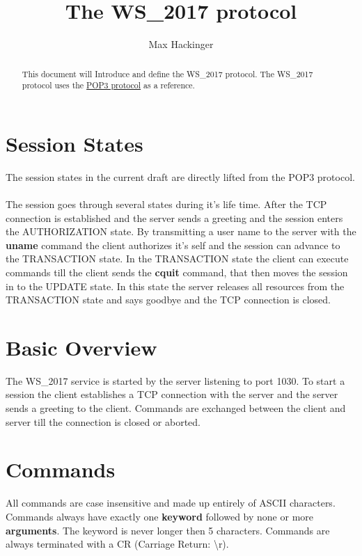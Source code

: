\documentclass[a4paper,11pt]{article}
\title{The WS\_2017 protocol}
\author{Max Hackinger}
\begin{document}
\maketitle
\tableofcontents
\clearpage

\begin{abstract}
This document will Introduce and define the WS\_2017 protocol.
The WS\_2017 protocol uses the \href{https://tools.ietf.org/html/rfc1939}{POP3 protocol} as a reference.
\end{abstract}

\section{Session States}
The session states in the current draft are directly lifted from the POP3 protocol.\\\\
The session goes through several states during it's life time. After the TCP connection is established and the server sends a greeting and the session enters the AUTHORIZATION state. By transmitting a user name to the server with the \textbf{uname} command the client authorizes it's self and the session can advance to the TRANSACTION state. In the TRANSACTION state the client can execute commands till the client sends the \textbf{cquit} command, that then moves the session in to the UPDATE state. In this state the server releases all resources from the TRANSACTION state and says goodbye and the TCP connection is closed.

\section{Basic Overview}
The WS\_2017 service is started by the server listening to port 1030. To start a session the client establishes a TCP connection with the server and the server sends a greeting to the client. Commands are exchanged between the client and server till the connection is closed or aborted.

\section{Commands}
All commands are case insensitive and made up entirely of ASCII characters. Commands always have exactly one \textbf{keyword} followed by none or more \textbf{arguments}. The keyword is never longer then 5 characters. Commands are always terminated with a CR (Carriage Return: \textbackslash r).
\clearpage
\end{document}
